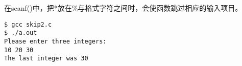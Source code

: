 \begin{frame}[fragile]
\tf 在scanf()中，把*放在\%与格式字符之间时，会使函数跳过相应的输入项目。
\end{frame}

\begin{frame}[fragile]


\end{frame}

\begin{frame}[fragile]
\begin{lstlisting}[showspaces=true,backgroundcolor=\color{red!10}]
$ gcc skip2.c
$ ./a.out
Please enter three integers:
10 20 30
The last integer was 30
\end{lstlisting}
\end{frame}





